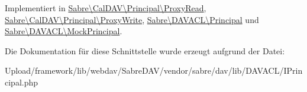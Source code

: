 Implementiert in \mbox{\hyperlink{class_sabre_1_1_cal_d_a_v_1_1_principal_1_1_proxy_read_a81207ae5aa2c621720fc975895bd67fc}{Sabre\textbackslash{}\+Cal\+D\+A\+V\textbackslash{}\+Principal\textbackslash{}\+Proxy\+Read}}, \mbox{\hyperlink{class_sabre_1_1_cal_d_a_v_1_1_principal_1_1_proxy_write_a83ad463bd6b99c4db55fc63bb37ebafb}{Sabre\textbackslash{}\+Cal\+D\+A\+V\textbackslash{}\+Principal\textbackslash{}\+Proxy\+Write}}, \mbox{\hyperlink{class_sabre_1_1_d_a_v_a_c_l_1_1_principal_a6274148b9a018ed90644755687c61d96}{Sabre\textbackslash{}\+D\+A\+V\+A\+C\+L\textbackslash{}\+Principal}} und \mbox{\hyperlink{class_sabre_1_1_d_a_v_a_c_l_1_1_mock_principal_a2b96db589430a20911aac5fca211adba}{Sabre\textbackslash{}\+D\+A\+V\+A\+C\+L\textbackslash{}\+Mock\+Principal}}.



Die Dokumentation für diese Schnittstelle wurde erzeugt aufgrund der Datei\+:\begin{DoxyCompactItemize}
\item 
Upload/framework/lib/webdav/\+Sabre\+D\+A\+V/vendor/sabre/dav/lib/\+D\+A\+V\+A\+C\+L/I\+Principal.\+php\end{DoxyCompactItemize}
